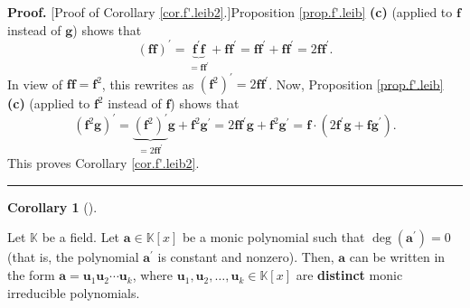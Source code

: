 \documentclass[numbers=enddot,12pt,final,onecolumn,notitlepage]{scrartcl}%
\theoremstyle{definition}
\newtheorem{coro}[theo]{Corollary}
\newenvironment{corollary}[1][]
{\begin{coro}[#1]\begin{leftbar}}
{\end{leftbar}\end{coro}}
\newenvironment{proof}[1][Proof]{\noindent\textbf{#1.} }{\ \rule{0.5em}{0.5em}}
\begin{document}
\begin{proof}
[Proof of Corollary \ref{cor.f'.leib2}.]Proposition \ref{prop.f'.leib}
\textbf{(c)} (applied to $\mathbf{f}$ instead of $\mathbf{g}$) shows that%
\[
\left(  \mathbf{ff}\right)  ^{\prime}=\underbrace{\mathbf{f}^{\prime
}\mathbf{f}}_{=\mathbf{ff}^{\prime}}+\mathbf{ff}^{\prime}=\mathbf{ff}^{\prime
}+\mathbf{ff}^{\prime}=2\mathbf{ff}^{\prime}.
\]
In view of $\mathbf{ff}=\mathbf{f}^{2}$, this rewrites as $\left(
\mathbf{f}^{2}\right)  ^{\prime}=2\mathbf{ff}^{\prime}$. Now, Proposition
\ref{prop.f'.leib} \textbf{(c)} (applied to $\mathbf{f}^{2}$ instead of
$\mathbf{f}$) shows that%
\[
\left(  \mathbf{f}^{2}\mathbf{g}\right)  ^{\prime}=\underbrace{\left(
\mathbf{f}^{2}\right)  ^{\prime}}_{=2\mathbf{ff}^{\prime}}\mathbf{g}%
+\mathbf{f}^{2}\mathbf{g}^{\prime}=2\mathbf{ff}^{\prime}\mathbf{g}%
+\mathbf{f}^{2}\mathbf{g}^{\prime}=\mathbf{f}\cdot\left(  2\mathbf{f}^{\prime
}\mathbf{g}+\mathbf{fg}^{\prime}\right)  .
\]
This proves Corollary \ref{cor.f'.leib2}.
\end{proof}

\begin{corollary}
\label{cor.irred-factor-distinct}Let $\mathbb{K}$ be a field. Let
$\mathbf{a}\in\mathbb{K}\left[  x\right]  $ be a monic polynomial such that
$\deg\left(  \mathbf{a}^{\prime}\right)  =0$ (that is, the polynomial
$\mathbf{a}^{\prime}$ is constant and nonzero). Then, $\mathbf{a}$ can be
written in the form $\mathbf{a}=\mathbf{u}_{1}\mathbf{u}_{2}\cdots
\mathbf{u}_{k}$, where $\mathbf{u}_{1},\mathbf{u}_{2},\ldots,\mathbf{u}_{k}%
\in\mathbb{K}\left[  x\right]  $ are \textbf{distinct} monic irreducible polynomials.
\end{corollary}
\end{document}

